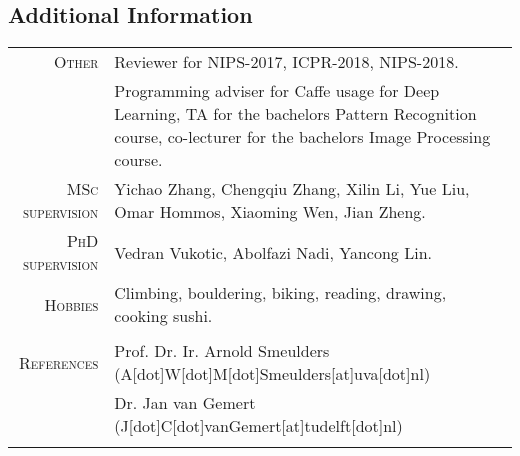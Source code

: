 \documentclass[a4paper, oneside, final]{scrartcl}
\begin{document}
\begin{center}
		\section{Additional Information}
		\begin{tabular}{r@{\hskip 0.3in}p{11.3cm}}
			\textsc{Other}			 &  Reviewer for NIPS-2017, ICPR-2018, NIPS-2018.\\
									 &	Programming adviser for Caffe usage for Deep Learning, TA for the bachelors Pattern Recognition course, co-lecturer for the bachelors Image Processing course.\\
			\textsc{MSc supervision} & Yichao Zhang, Chengqiu Zhang, Xilin Li, Yue Liu, Omar Hommos, Xiaoming Wen, Jian Zheng.\\
			\textsc{PhD supervision} & Vedran Vukotic, Abolfazi Nadi, Yancong Lin.\\[5px] 
			\textsc{Hobbies}		 & Climbing, bouldering, biking, reading, drawing, cooking sushi.\\					 
			\multicolumn{2}{c}{}\\

			\textsc{References} & Prof. Dr. Ir. Arnold Smeulders (A[dot]W[dot]M[dot]Smeulders[at]uva[dot]nl)\\
								& Dr. Jan van Gemert (J[dot]C[dot]vanGemert[at]tudelft[dot]nl)\\[5px]	
			\multicolumn{2}{c}{}\\
		\end{tabular}
	\end{center}
\end{document}
